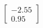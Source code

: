 \documentclass[preview]{standalone}
\begin{document}
\begin{align*}
\begin{bmatrix} -2.55 \\ 0.95 \end{bmatrix}
\end{align*}
\end{document}
